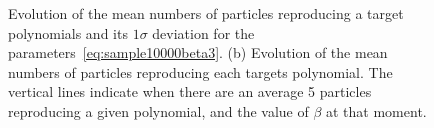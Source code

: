\documentclass[11pt]{article}
\begin{document}
\begin{enumerate}
	  \begin{figure}[h!]
	  	\centering
	  	\caption{Evolution of the mean numbers of particles reproducing a target polynomials and its $1\sigma$ deviation for the parameters~\eqref{eq:sample10000beta3}. (b) Evolution of the mean numbers of particles reproducing each targets polynomial. The vertical lines indicate when there are an average 5 particles reproducing a given polynomial, and the value of $\beta$ at that moment.}
	  	\label{fig:sample10000beta3}
	  \end{figure}


\end{enumerate}
\end{document}
